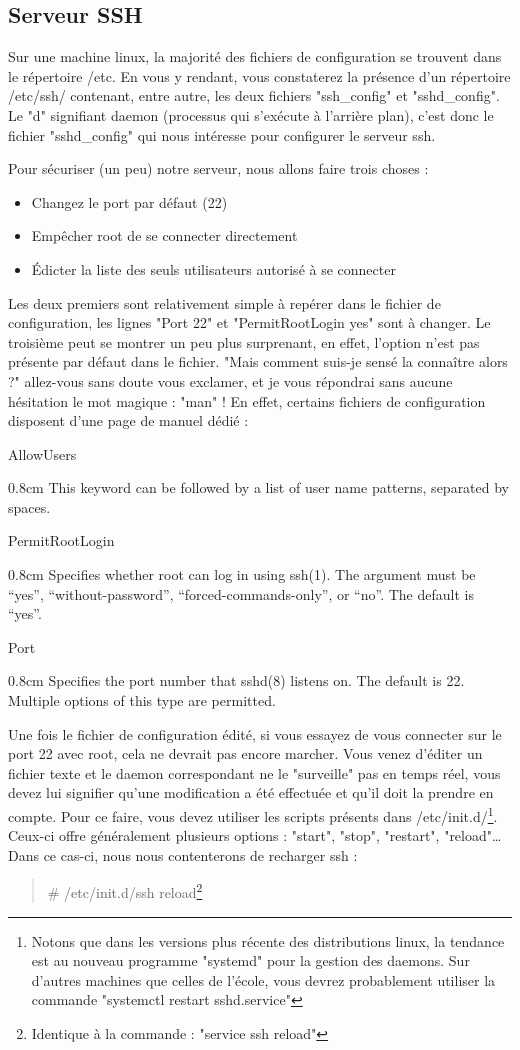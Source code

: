 \documentclass[a4paper]{article}
\newcommand{\commande}[1] {
    \begin{quote}
    \tt\raggedright #1 
    \end{quote}
}
\newcommand{\man}[2]{
    \begin{tcolorbox}[toprule=3mm,width=\textwidth,outer arc=0mm,colbacktitle=grayman,coltitle=black,colback={grayman},colframe={grayman},title={man : \tt #1}]
        \tt\raggedright #2
    \end{tcolorbox}
}
\newcommand{\mandesc}[1]{
    \begin{adjustwidth}{0.8cm}{}
        #1
    \end{adjustwidth}
}
\begin{document}
\subsection{Serveur SSH}
\par Sur une machine linux, la majorité des fichiers de configuration se trouvent dans le répertoire /etc. En vous y rendant, vous constaterez la présence d'un répertoire /etc/ssh/ contenant, entre autre, les deux fichiers "ssh\_config" et "sshd\_config". Le "d" signifiant daemon (processus qui s'exécute à l'arrière plan), c'est donc le fichier "sshd\_config" qui nous intéresse pour configurer le serveur ssh.
\par Pour sécuriser (un peu) notre serveur, nous allons faire trois choses :
\begin{itemize}
    \item Changez le port par défaut (22)
    \item Empêcher root de se connecter directement
    \item Édicter la liste des seuls utilisateurs autorisé à se connecter
\end{itemize}
\par Les deux premiers sont relativement simple à repérer dans le fichier de configuration, les lignes "Port 22" et "PermitRootLogin yes" sont à changer. Le troisième peut se montrer un peu plus surprenant, en effet, l'option n'est pas présente par défaut dans le fichier. "Mais comment suis-je sensé la connaître alors ?" allez-vous sans doute vous exclamer, et je vous répondrai sans aucune hésitation le mot magique : "man" ! En effet, certains fichiers de configuration disposent d'une page de manuel dédié :
\man{sshd\_config}{
AllowUsers
\mandesc{This keyword can be followed by a list of user name patterns, separated by spaces.}
PermitRootLogin
\mandesc{Specifies whether root can log in using ssh(1).  The argument must be “yes”, “without-password”, “forced-commands-only”, or “no”. The default is “yes”.}
Port
\mandesc{Specifies the port number that sshd(8) listens on.  The default is 22.  Multiple options of this type are permitted.}
}
\par Une fois le fichier de configuration édité, si vous essayez de vous connecter sur le port 22 avec root, cela ne devrait pas encore marcher. Vous venez d'éditer un fichier texte et le daemon correspondant ne le "surveille" pas en temps réel, vous devez lui signifier qu'une modification a été effectuée et qu'il doit la prendre en compte. Pour ce faire, vous devez utiliser les scripts présents dans /etc/init.d/\footnote{Notons que dans les versions plus récente des distributions linux, la tendance est au nouveau programme "systemd" pour la gestion des daemons. Sur d'autres machines que celles de l'école, vous devrez probablement utiliser la commande "systemctl restart sshd.service"}. Ceux-ci offre généralement plusieurs options : "start", "stop", "restart", "reload"\ldots Dans ce cas-ci, nous nous contenterons de recharger ssh :
\commande{\# /etc/init.d/ssh reload\footnote{Identique à la commande : "service ssh reload"}}
\end{document}
